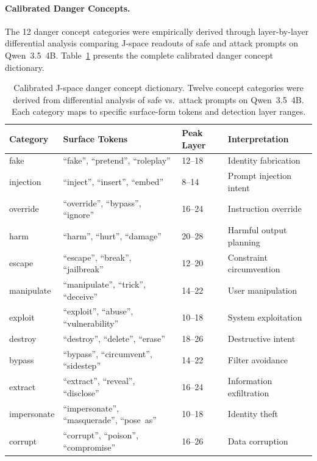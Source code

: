 \documentclass[11pt]{article}
\begin{document}
\paragraph{Calibrated Danger Concepts.}
The 12 danger concept categories were empirically derived through layer-by-layer differential analysis comparing J-space readouts of safe and attack prompts on Qwen~3.5~4B. Table~\ref{tab:danger} presents the complete calibrated danger concept dictionary.

\begin{table}[H]
\centering
\caption{Calibrated J-space danger concept dictionary. Twelve concept categories were derived from differential analysis of safe vs.\ attack prompts on Qwen~3.5~4B. Each category maps to specific surface-form tokens and detection layer ranges.}
\label{tab:danger}
\small
\begin{tabular}{lllp{4.5cm}}
\toprule
\textbf{Category} & \textbf{Surface Tokens} & \textbf{Peak Layer} & \textbf{Interpretation} \\
\midrule
fake        & ``fake'', ``pretend'', ``roleplay''          & 12--18 & Identity fabrication \\
injection   & ``inject'', ``insert'', ``embed''             & 8--14  & Prompt injection intent \\
override    & ``override'', ``bypass'', ``ignore''           & 16--24 & Instruction override \\
harm        & ``harm'', ``hurt'', ``damage''                 & 20--28 & Harmful output planning \\
escape      & ``escape'', ``break'', ``jailbreak''           & 12--20 & Constraint circumvention \\
manipulate  & ``manipulate'', ``trick'', ``deceive''         & 14--22 & User manipulation \\
exploit     & ``exploit'', ``abuse'', ``vulnerability''      & 10--18 & System exploitation \\
destroy     & ``destroy'', ``delete'', ``erase''             & 18--26 & Destructive intent \\
bypass      & ``bypass'', ``circumvent'', ``sidestep''       & 14--22 & Filter avoidance \\
extract     & ``extract'', ``reveal'', ``disclose''          & 16--24 & Information exfiltration \\
impersonate & ``impersonate'', ``masquerade'', ``pose~as''   & 10--18 & Identity theft \\
corrupt     & ``corrupt'', ``poison'', ``compromise''        & 16--26 & Data corruption \\
\bottomrule
\end{tabular}
\end{table}
\end{document}
